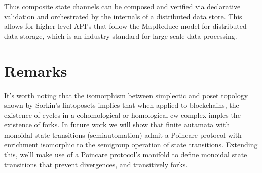 \documentclass{article}
\begin{document}
Thus composite state channels can be composed and verified via declarative validation and orchestrated by the internals of a distributed data store. This allows for higher level API's that follow the MapReduce model for distributed data storage, which is an industry standard for large scale data processing. 


\section{Remarks} 
It's worth noting that the isomorphism between simplectic and poset topology shown by Sorkin's fintoposets implies that when applied to blockchains, the existence of cycles in a cohomological or homological cw-complex imples the existence of forks. In future work we will show that finite autamata with monoidal state transitions (semiautomation) admit a Poincare protocol with enrichment isomorphic to the semigroup operation of state transitions. Extending this, we'll make use of a Poincare protocol's manifold to define monoidal state transitions that prevent divergences, and transitively forks.


\end{document}
